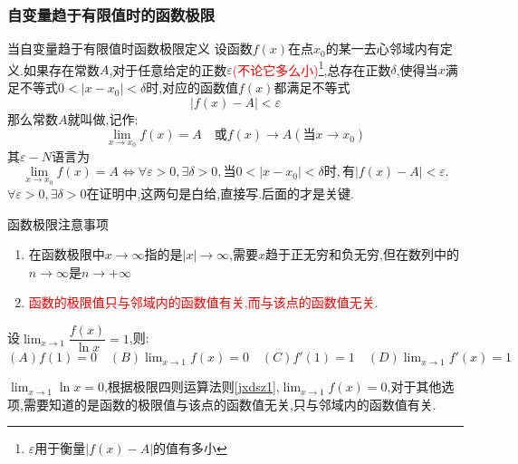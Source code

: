 \documentclass[8pt a4paper, oneside, UTF8]{ctexbook}
\begin{document}
\begin{sloppypar}
    \subsubsection{自变量趋于有限值时的函数极限}
    \begin{defn}{当自变量趋于有限值时函数极限定义}{}
        设函数$f(x)$在点$x_0$的某一去心邻域内有定义.如果存在常数$A$,对于任意给定的正数$\varepsilon$\textcolor{red}{(不论它多么小)\footnote{$\varepsilon$用于衡量$|f(x)-A|$的值有多小}},总存在正数$\delta$,使得当$x$满足不等式$0<|x-x_0|<\delta$时,对应的函数值$f(x)$都满足不等式
        $$
            |f(x)-A|<\varepsilon
        $$
        那么常数$A$就叫做,记作:
        $$
            \lim_{x\to x_0}f(x)=A\quad\text{或}f(x)\to A(\text{当}x\to x_0)
        $$
        其$\varepsilon-N$语言为
        $$
            \lim_{x\to x_0}f(x)=A\Leftrightarrow\forall\varepsilon>0,\exists\delta>0,\text{当}0<|x-x_0|<\delta\text{时},\text{有}|f(x)-A|<\varepsilon.
        $$
        $\forall\varepsilon>0,\exists\delta>0$在证明中,这两句是白给,直接写.后面的才是关键.
    \end{defn}
    \begin{criterion}{函数极限注意事项}{}
        \begin{enumerate}
            \item 在函数极限中$x \to \infty$指的是$|x| \to \infty$,需要$x$趋于正无穷和负无穷,但在数列中的$n \to \infty$是$n \to +\infty$
            \item \textcolor{red}{函数的极限值只与邻域内的函数值有关,而与该点的函数值无关}.
        \end{enumerate}
    \end{criterion}
    \begin{problem}
    设$\lim_{x \to 1}\dfrac{f(x)}{\ln x}=1$,则:\\
    $(A) f(1)=0 \quad (B)\lim_{x\to 1}f(x)=0 \quad (C)f'(1)=1 \quad (D)\lim_{x \to 1}f'(x)=1$
    \end{problem}
    \begin{solution}
        $\lim_{x\to 1}\ln x=0$,根据极限四则运算法则\ref{jxdsz1},$\lim_{x \to 1} f(x)=0$,对于其他选项,需要知道的是函数的极限值与该点的函数值无关,只与邻域内的函数值有关.
    \end{solution}

\end{sloppypar}
\end{document}
